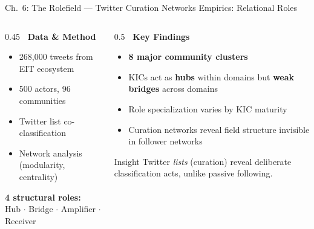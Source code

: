 \documentclass[aspectratio=169]{beamer}
\newcommand{\secmark}[1]{\hfill{\scriptsize\color{gray}#1}}
\begin{document}
\begin{frame}{Ch.~6: The Rolefield --- Twitter Curation Networks}
\secmark{Empirics: Relational Roles}
\begin{columns}[T]
\begin{column}{0.45\textwidth}
    \textbf{\faDatabase\ Data \& Method}
    \begin{itemize}
        \item 268,000 tweets from EIT ecosystem
        \item 500 actors, 96 communities
        \item Twitter list co-classification
        \item Network analysis (modularity, centrality)
    \end{itemize}
    \vspace{0.5em}
    \textbf{4 structural roles:}\\
    {\small Hub $\cdot$ Bridge $\cdot$ Amplifier $\cdot$ Receiver}
\end{column}
\begin{column}{0.5\textwidth}
    \textbf{\faLightbulb[regular]\ Key Findings}
    \begin{itemize}
        \item \textbf{8 major community clusters}
        \item KICs act as \textbf{hubs} within domains but \textbf{weak bridges} across domains
        \item Role specialization varies by KIC maturity
        \item Curation networks reveal field structure invisible in follower networks
    \end{itemize}
    \vspace{0.3em}
    \begin{block}{\scriptsize Insight}
        \scriptsize Twitter \emph{lists} (curation) reveal deliberate classification acts, unlike passive following.
    \end{block}
\end{column}
\end{columns}
\end{frame}
\end{document}
